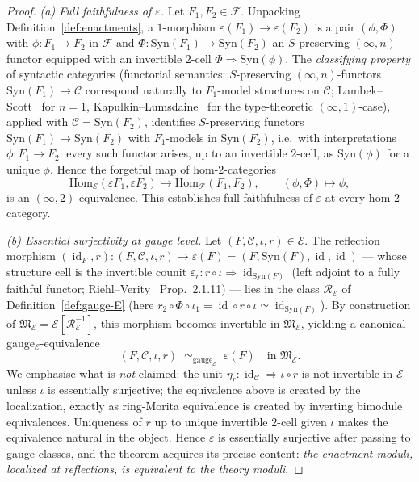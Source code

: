 \documentclass[11pt]{article}
\theoremstyle{plain}
\theoremstyle{definition}
\newcommand{\cF}{\mathcal{F}}
\newcommand{\cC}{\mathcal{C}}
\newcommand{\fM}{\mathfrak{M}}
\newcommand{\Hom}{\mathrm{Hom}}
\newcommand{\Syn}{\mathrm{Syn}}
\newcommand{\cE}{\mathcal{E}}
\DeclareMathOperator{\id}{id}
\begin{document}
\begin{proof}
\emph{(a) Full faithfulness of $\varepsilon$.} Let $F_1, F_2 \in \cF$. Unpacking Definition~\ref{def:enactments}, a $1$-morphism $\varepsilon(F_1) \to \varepsilon(F_2)$ is a pair $(\phi, \Phi)$ with $\phi : F_1 \to F_2$ in $\cF$ and $\Phi : \Syn(F_1) \to \Syn(F_2)$ an $S$-preserving $(\infty, n)$-functor equipped with an invertible $2$-cell $\Phi \Rightarrow \Syn(\phi)$. The \emph{classifying property} of syntactic categories (functorial semantics: $S$-preserving $(\infty, n)$-functors $\Syn(F_1) \to \cC$ correspond naturally to $F_1$-model structures on $\cC$; Lambek--Scott~\cite{LambekScott1986} for $n = 1$, Kapulkin--Lumsdaine~\cite{KapulkinLumsdaine2021} for the type-theoretic $(\infty, 1)$-case), applied with $\cC = \Syn(F_2)$, identifies $S$-preserving functors $\Syn(F_1) \to \Syn(F_2)$ with $F_1$-models in $\Syn(F_2)$, i.e.\ with interpretations $\phi : F_1 \to F_2$: every such functor arises, up to an invertible $2$-cell, as $\Syn(\phi)$ for a unique $\phi$. Hence the forgetful map of hom-$2$-categories
\[
  \Hom_{\cE}(\varepsilon F_1, \varepsilon F_2) \longrightarrow \Hom_{\cF}(F_1, F_2), \qquad (\phi, \Phi) \mapsto \phi,
\]
is an $(\infty, 2)$-equivalence. This establishes full faithfulness of $\varepsilon$ at every hom-$2$-category.

\emph{(b) Essential surjectivity at gauge level.} Let $(F, \cC, \iota, r) \in \cE$. The reflection morphism $(\id_F, r) : (F, \cC, \iota, r) \to \varepsilon(F) = (F, \Syn(F), \id, \id)$ --- whose structure cell is the invertible counit $\varepsilon_r : r \circ \iota \Rightarrow \id_{\Syn(F)}$ (left adjoint to a fully faithful functor; Riehl--Verity~\cite{RiehlVerity2022} Prop.~2.1.11) --- lies in the class $\mathcal{R}_\cE$ of Definition~\ref{def:gauge-E} (here $r_2 \circ \Phi \circ \iota_1 = \id \circ r \circ \iota \simeq \id_{\Syn(F)}$). By construction of $\fM_\cE = \cE[\mathcal{R}_\cE^{-1}]$, this morphism becomes invertible in $\fM_\cE$, yielding a canonical gauge$_\cE$-equivalence
\[
  (F, \cC, \iota, r) \;\simeq_{\mathrm{gauge}_\cE}\; \varepsilon(F) \quad\text{in } \fM_\cE.
\]
We emphasise what is \emph{not} claimed: the unit $\eta_r : \id_\cC \Rightarrow \iota \circ r$ is not invertible in $\cE$ unless $\iota$ is essentially surjective; the equivalence above is created by the localization, exactly as ring-Morita equivalence is created by inverting bimodule equivalences. Uniqueness of $r$ up to unique invertible $2$-cell given $\iota$ makes the equivalence natural in the object. Hence $\varepsilon$ is essentially surjective after passing to gauge-classes, and the theorem acquires its precise content: \emph{the enactment moduli, localized at reflections, is equivalent to the theory moduli}.


\end{proof}
\end{document}
